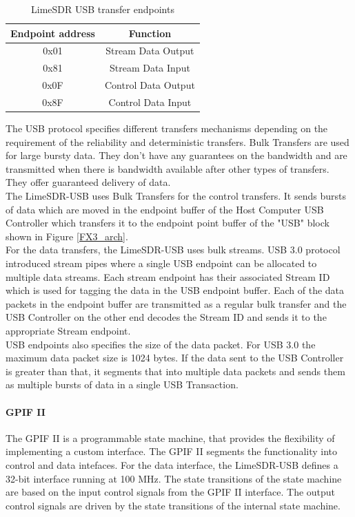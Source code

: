 \begin{table}[h!]
\centering
\begin{tabular}{|c|c|}
\hline
Endpoint address & Function\\
\hline
0x01 & Stream Data Output\\
0x81 & Stream Data Input\\
0x0F & Control Data Output\\
0x8F & Control Data Input\\
\hline
\end{tabular}
\caption{LimeSDR USB transfer endpoints}
\label{Lime-USB_ep}
\end{table}

The \ac{USB} protocol specifies different transfers mechanisms depending on the requirement of the reliability and deterministic transfers.
Bulk Transfers are used for large bursty data.
They don't have any guarantees on the bandwidth and are transmitted when there is bandwidth available after other types of transfers.
They offer guaranteed delivery of data.\\

The LimeSDR-USB uses Bulk Transfers for the control transfers.
It sends bursts of data which are moved in the endpoint buffer of the Host Computer USB Controller which transfers it to the endpoint point buffer of the "USB" block shown in Figure \ref{FX3_arch}.\\

For the data transfers, the LimeSDR-USB uses bulk streams.
USB 3.0 protocol introduced stream pipes where a single \ac{USB} endpoint can be allocated to multiple data streams.
Each stream endpoint has their associated Stream ID which is used for tagging the data in the USB endpoint buffer.
Each of the data packets in the endpoint buffer are transmitted as a regular bulk transfer and the USB Controller on the other end decodes the Stream ID and sends it to the appropriate Stream endpoint. \\

USB endpoints also specifies the size of the data packet.
For USB 3.0 the maximum data packet size is 1024 bytes.
If the data sent to the USB Controller is greater than that, it segments that into multiple data packets and sends them as multiple bursts of data in a single USB Transaction. 
 
\paragraph{GPIF II}
The \ac{GPIF} II is a programmable state machine, that provides the flexibility of implementing a custom interface.
The GPIF II segments the functionality into control and data intefaces.
For the data interface, the LimeSDR-USB defines a 32-bit interface running at 100 MHz.
The state transitions of the state machine are based on the input control signals from the GPIF II interface.
The output control signals are driven by the state transitions of the internal state machine.\\

